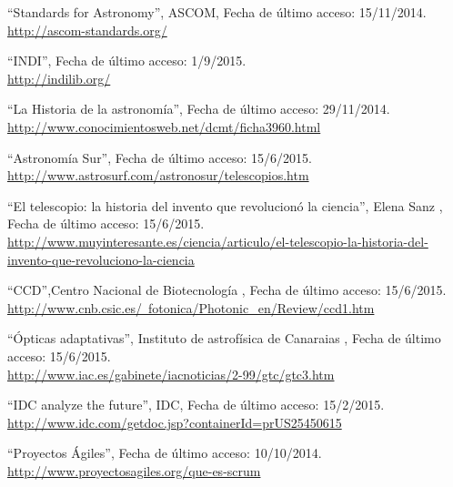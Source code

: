 

 ``Standards for Astronomy'', ASCOM, Fecha de último acceso: 15/11/2014.\\ \href{http://ascom-standards.org/}{http://ascom-standards.org/}

 ``INDI'', Fecha de último acceso: 1/9/2015.\\ \href{http://indilib.org/}{http://indilib.org/}

 ``La Historia de la astronomía'', Fecha de último acceso: 29/11/2014.\\ \href{http://www.conocimientosweb.net/dcmt/ficha3960.html}{http://www.conocimientosweb.net/dcmt/ficha3960.html}


 ``Astronomía Sur'', Fecha de último acceso: 15/6/2015.\\ \href{http://www.astrosurf.com/astronosur/telescopios.htm}{http://www.astrosurf.com/astronosur/telescopios.htm}

 ``El telescopio: la historia del invento que revolucionó la ciencia'', Elena Sanz , Fecha de último acceso: 15/6/2015.\\ \href{http://www.muyinteresante.es/ciencia/articulo/el-telescopio-la-historia-del-invento-que-revoluciono-la-ciencia}{http://www.muyinteresante.es/ciencia/articulo/el-telescopio-la-historia-del-invento-que-revoluciono-la-ciencia}

 ``CCD'',Centro Nacional de Biotecnología , Fecha de último acceso: 15/6/2015.\\ \href{http://www.cnb.csic.es/~fotonica/Photonic_en/Review/ccd1.htm}{http://www.cnb.csic.es/~fotonica/Photonic\_en/Review/ccd1.htm}

 ``Ópticas adaptativas'', Instituto de astrofísica de Canaraias , Fecha de último acceso: 15/6/2015.\\ \href{http://www.iac.es/gabinete/iacnoticias/2-99/gtc/gtc3.htm}{http://www.iac.es/gabinete/iacnoticias/2-99/gtc/gtc3.htm}

 ``IDC analyze the future'', IDC, Fecha de último acceso: 15/2/2015.\\ \href{http://www.idc.com/getdoc.jsp?containerId=prUS25450615}{http://www.idc.com/getdoc.jsp?containerId=prUS25450615}


 ``Proyectos Ágiles'', Fecha de último acceso: 10/10/2014.\\ \href{http://www.proyectosagiles.org/que-es-scrum}{http://www.proyectosagiles.org/que-es-scrum}

